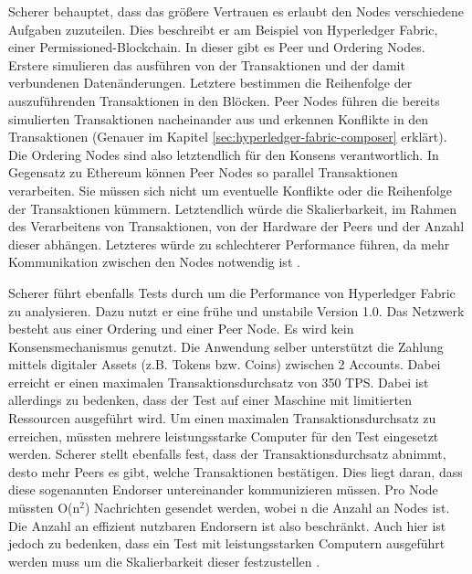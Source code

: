 Scherer behauptet, dass das größere Vertrauen es erlaubt den Nodes verschiedene Aufgaben zuzuteilen. Dies beschreibt er am Beispiel von Hyperledger Fabric, einer Permissioned-Blockchain. In dieser gibt es Peer und Ordering Nodes. Erstere simulieren das ausführen von der Transaktionen und der damit verbundenen Datenänderungen. Letztere bestimmen die Reihenfolge der auszuführenden Transaktionen in den Blöcken. Peer Nodes führen die bereits simulierten Transaktionen nacheinander aus und erkennen Konflikte in den Transaktionen (Genauer im Kapitel \ref{sec:hyperledger-fabric-composer} erklärt). Die Ordering Nodes sind also letztendlich für den Konsens verantwortlich. In Gegensatz zu Ethereum können Peer Nodes so parallel Transaktionen verarbeiten. Sie müssen sich nicht um eventuelle Konflikte oder die Reihenfolge der Transaktionen kümmern. Letztendlich würde die Skalierbarkeit, im Rahmen des Verarbeitens von Transaktionen, von der Hardware der Peers und der Anzahl dieser abhängen. Letzteres würde zu schlechterer Performance führen, da mehr Kommunikation zwischen den Nodes notwendig ist \cite{SchererPerformanceScalabilityBlockchain2017}.

Scherer führt ebenfalls Tests durch um die Performance von Hyperledger Fabric zu analysieren. Dazu nutzt er eine frühe und unstabile Version 1.0. Das Netzwerk besteht aus einer Ordering und einer Peer Node. Es wird kein Konsensmechanismus genutzt. Die Anwendung selber unterstützt die Zahlung mittels digitaler Assets (z.B. Tokens bzw. Coins) zwischen 2 Accounts. Dabei erreicht er einen maximalen Transaktionsdurchsatz von 350 TPS. Dabei ist allerdings zu bedenken, dass der Test auf einer Maschine mit limitierten Ressourcen ausgeführt wird. Um einen maximalen Transaktionsdurchsatz zu erreichen, müssten mehrere leistungsstarke Computer für den Test eingesetzt werden. Scherer stellt ebenfalls fest, dass der Transaktionsdurchsatz abnimmt, desto mehr Peers es gibt, welche Transaktionen bestätigen. Dies liegt daran, dass diese sogenannten Endorser untereinander kommunizieren müssen. Pro Node müssten O(n$^2$) Nachrichten gesendet werden, wobei n die Anzahl an Nodes ist. Die Anzahl an effizient nutzbaren Endorsern ist also beschränkt. Auch hier ist jedoch zu bedenken, dass ein Test mit leistungsstarken Computern ausgeführt werden muss um die Skalierbarkeit dieser festzustellen \cite{SchererPerformanceScalabilityBlockchain2017}.

